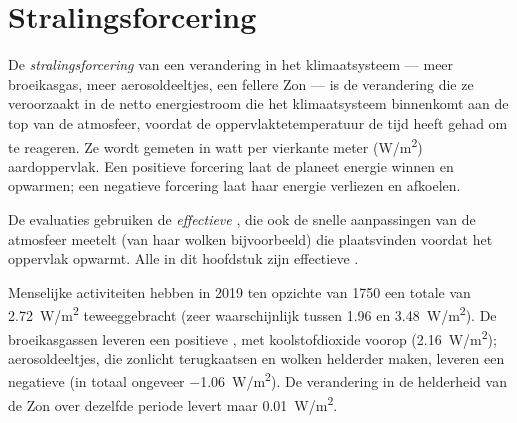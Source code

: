\section{Stralingsforcering}

\begin{definition}[Stralingsforcering]\label{def:g12:climate-change:forcing}
De \emph{stralingsforcering} van een verandering in het
klimaatsysteem --- meer broeikasgas, meer aerosoldeeltjes, een fellere
Zon --- is de verandering die ze veroorzaakt in de netto energiestroom die het
klimaatsysteem binnenkomt aan de top van de atmosfeer, voordat de oppervlaktetemperatuur
de tijd heeft gehad om te reageren. Ze wordt gemeten in watt per vierkante meter
(\unit{W/m^2}) aardoppervlak. Een positieve forcering laat de planeet
energie winnen en opwarmen; een negatieve forcering laat haar energie verliezen en afkoelen.
\end{definition}

\begin{remark}\label{rem:g12:climate-change:effective}
De evaluaties gebruiken de \emph{effectieve} , die ook
de snelle aanpassingen van de atmosfeer meetelt (van haar wolken bijvoorbeeld)
die plaatsvinden voordat het oppervlak opwarmt. Alle  in dit hoofdstuk zijn
effectieve .
\end{remark}

\begin{proposition}\label{prop:g12:climate-change:forcing}
Menselijke activiteiten hebben in 2019 ten opzichte van 1750 een totale  van
\qty{2.72}{W/m^2} teweeggebracht (zeer waarschijnlijk tussen 1.96 en
\qty{3.48}{W/m^2}). De broeikasgassen leveren een positieve , met
koolstofdioxide voorop (\qty{2.16}{W/m^2}); aerosoldeeltjes, die
zonlicht terugkaatsen en wolken helderder maken, leveren een negatieve (in totaal ongeveer
\qty{-1.06}{W/m^2}). De verandering in de helderheid van de Zon over dezelfde
periode levert maar \qty{0.01}{W/m^2}.
\end{proposition}

